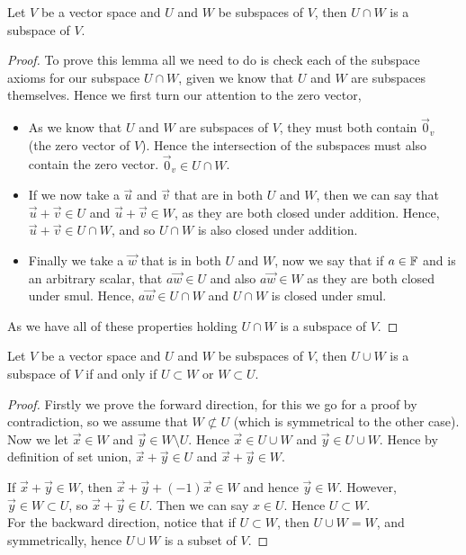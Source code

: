 \documentclass{article}
\begin{document}
\begin{nlemma}
  Let $V$ be a vector space and $U$ and $W$ be subspaces of $V$, then $U\cap W$ is a subspace of $V$.
\end{nlemma}
\begin{proof}
  To prove this lemma all we need to do is check each of the subspace axioms for our subspace $U \cap W$, given we know that $U$ and $W$ are subspaces themselves. Hence we first turn our attention to the zero vector,\\

  \noindent
  \begin{itemize}
    \item As we know that $U$ and $W$ are subspaces of $V$, they must both contain $\vec 0_v$ (the zero vector of $V$). Hence the intersection of the subspaces must also contain the zero vector. $\vec 0_v \in U \cap W$.
    \item If we now take a $\vec u$ and $\vec v$ that are in both $U$ and $W$, then we can say that $\vec u + \vec v \in U$ and $\vec u + \vec v \in W$, as they are both closed under addition. Hence, $\vec u + \vec v \in U \cap W$, and so $U \cap W$ is also closed under addition.
    \item Finally we take a $\vec w$ that is in both $U$ and $W$, now we say that if $a \in \mathbb{F}$ and is an arbitrary scalar, that $a\vec w \in U$ and also $a\vec w \in W$ as they are both closed under smul. Hence, $a\vec w \in U \cap W$ and $U\cap W$ is closed under smul.
  \end{itemize}
  As we have all of these properties holding $U \cap W$ is a subspace of $V$.
\end{proof}

\begin{nlemma}
    Let $V$ be a vector space and $U$ and $W$ be subspaces of $V$, then $U\cup W$ is a subspace of $V$ if and only if $U \subset W$ or $W \subset U$.
\end{nlemma}

\begin{proof}
  Firstly we prove the forward direction, for this we go for a proof by contradiction, so we assume that $W \not\subset U$ (which is symmetrical to the other case). Now we let $\vec x \in W$ and $\vec y \in W \setminus U$. Hence $\vec x \in U \cup W$ and $\vec y \in U \cup W$. Hence by definition of set union, $\vec x  + \vec y \in U$ and $\vec x + \vec y \in W$.

  If $\vec x + \vec y \in W$, then $\vec x + \vec y + (-1) \vec x \in W$ and hence $\vec y \in W$. However, $\vec y \in W \subset U$, so $\vec x + \vec y \in U$. Then we can say $x \in U$. Hence $U \subset W$.\\

    \noindent
    For the backward direction, notice that if $U \subset W$, then $U \cup W = W$, and symmetrically, hence $U \cup W$ is a subset of $V$.
\end{proof}
\end{document}
